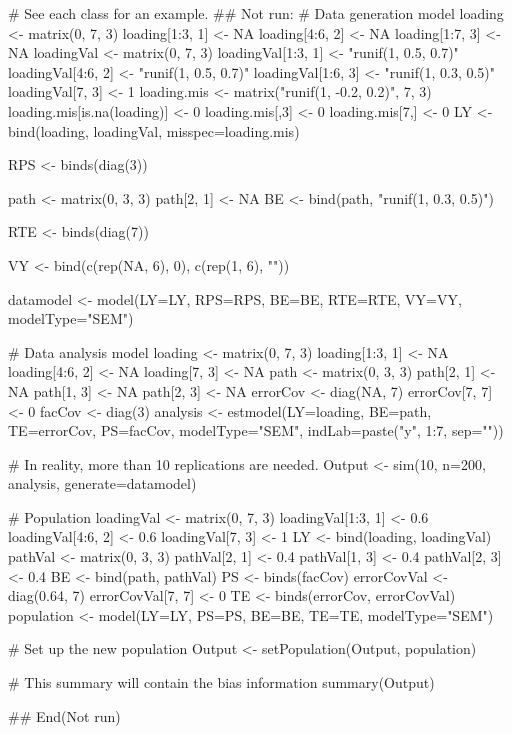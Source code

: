 \documentclass[a4paper]{book}
\begin{document}
\begin{Examples}
\begin{ExampleCode}
# See each class for an example.
## Not run: 
# Data generation model
loading <- matrix(0, 7, 3)
loading[1:3, 1] <- NA
loading[4:6, 2] <- NA
loading[1:7, 3] <- NA
loadingVal <- matrix(0, 7, 3)
loadingVal[1:3, 1] <- "runif(1, 0.5, 0.7)"
loadingVal[4:6, 2] <- "runif(1, 0.5, 0.7)"
loadingVal[1:6, 3] <- "runif(1, 0.3, 0.5)"
loadingVal[7, 3] <- 1
loading.mis <- matrix("runif(1, -0.2, 0.2)", 7, 3)
loading.mis[is.na(loading)] <- 0
loading.mis[,3] <- 0
loading.mis[7,] <- 0
LY <- bind(loading, loadingVal, misspec=loading.mis)

RPS <- binds(diag(3))

path <- matrix(0, 3, 3)
path[2, 1] <- NA
BE <- bind(path, "runif(1, 0.3, 0.5)")

RTE <- binds(diag(7))

VY <- bind(c(rep(NA, 6), 0), c(rep(1, 6), ""))

datamodel <- model(LY=LY, RPS=RPS, BE=BE, RTE=RTE, VY=VY, modelType="SEM")

# Data analysis model
loading <- matrix(0, 7, 3)
loading[1:3, 1] <- NA
loading[4:6, 2] <- NA
loading[7, 3] <- NA
path <- matrix(0, 3, 3)
path[2, 1] <- NA
path[1, 3] <- NA
path[2, 3] <- NA
errorCov <- diag(NA, 7)
errorCov[7, 7] <- 0
facCov <- diag(3)
analysis <- estmodel(LY=loading, BE=path, TE=errorCov, PS=facCov, modelType="SEM", 
	indLab=paste("y", 1:7, sep=""))

# In reality, more than 10 replications are needed.
Output <- sim(10, n=200, analysis, generate=datamodel)

# Population 
loadingVal <- matrix(0, 7, 3)
loadingVal[1:3, 1] <- 0.6
loadingVal[4:6, 2] <- 0.6
loadingVal[7, 3] <- 1
LY <- bind(loading, loadingVal)
pathVal <- matrix(0, 3, 3)
pathVal[2, 1] <- 0.4
pathVal[1, 3] <- 0.4
pathVal[2, 3] <- 0.4
BE <- bind(path, pathVal)
PS <- binds(facCov)
errorCovVal <- diag(0.64, 7)
errorCovVal[7, 7] <- 0
TE <- binds(errorCov, errorCovVal)
population <- model(LY=LY, PS=PS, BE=BE, TE=TE, modelType="SEM")

# Set up the new population
Output <- setPopulation(Output, population) 

# This summary will contain the bias information
summary(Output)

## End(Not run)
\end{ExampleCode}
\end{Examples}
\end{document}
